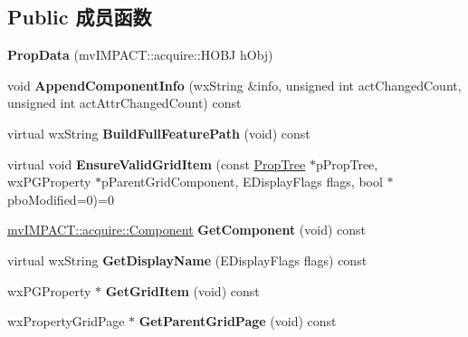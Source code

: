 \subsection*{Public 成员函数}
\begin{DoxyCompactItemize}
\item 
\hypertarget{class_prop_data_abbb2e4529f1ac267e0993a3cd8f817e4}{{\bfseries Prop\+Data} (mv\+I\+M\+P\+A\+C\+T\+::acquire\+::\+H\+O\+B\+J h\+Obj)}\label{class_prop_data_abbb2e4529f1ac267e0993a3cd8f817e4}

\item 
\hypertarget{class_prop_data_a29f57abc85bc4612fb2f6a55a5377dce}{void {\bfseries Append\+Component\+Info} (wx\+String \&info, unsigned int act\+Changed\+Count, unsigned int act\+Attr\+Changed\+Count) const }\label{class_prop_data_a29f57abc85bc4612fb2f6a55a5377dce}

\item 
\hypertarget{class_prop_data_ac48e26175ce99426e559cc46f013bdff}{virtual wx\+String {\bfseries Build\+Full\+Feature\+Path} (void) const }\label{class_prop_data_ac48e26175ce99426e559cc46f013bdff}

\item 
\hypertarget{class_prop_data_a8c8e7f56d0b4b6da5b56d7abd0bc6baa}{virtual void {\bfseries Ensure\+Valid\+Grid\+Item} (const \hyperlink{class_prop_tree}{Prop\+Tree} $\ast$p\+Prop\+Tree, wx\+P\+G\+Property $\ast$p\+Parent\+Grid\+Component, E\+Display\+Flags flags, bool $\ast$pbo\+Modified=0)=0}\label{class_prop_data_a8c8e7f56d0b4b6da5b56d7abd0bc6baa}

\item 
\hypertarget{class_prop_data_adea8df2f0a3328c7a2a005d314c44768}{\hyperlink{classmv_i_m_p_a_c_t_1_1acquire_1_1_component}{mv\+I\+M\+P\+A\+C\+T\+::acquire\+::\+Component} {\bfseries Get\+Component} (void) const }\label{class_prop_data_adea8df2f0a3328c7a2a005d314c44768}

\item 
\hypertarget{class_prop_data_a0fc528216a130bf751ffe898b72e8114}{virtual wx\+String {\bfseries Get\+Display\+Name} (E\+Display\+Flags flags) const }\label{class_prop_data_a0fc528216a130bf751ffe898b72e8114}

\item 
\hypertarget{class_prop_data_aeb815c967a6aaa8d3a0b5312175a8641}{wx\+P\+G\+Property $\ast$ {\bfseries Get\+Grid\+Item} (void) const }\label{class_prop_data_aeb815c967a6aaa8d3a0b5312175a8641}

\item 
\hypertarget{class_prop_data_a372674ae22b8690ea2b423d9c604a566}{wx\+Property\+Grid\+Page $\ast$ {\bfseries Get\+Parent\+Grid\+Page} (void) const }\label{class_prop_data_a372674ae22b8690ea2b423d9c604a566}


\end{DoxyCompactItemize}
